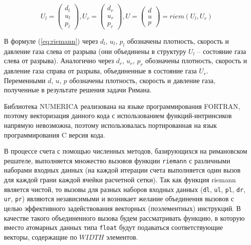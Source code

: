 \documentclass[
11pt,%
tightenlines,%
twoside,%
onecolumn,%
nofloats,%
nobibnotes,%
nofootinbib,%
superscriptaddress,%
noshowpacs,%
centertags]%
{revtex4}
\begin{document}
\begin{equation}\label{eq:riemann}
U_l = \left( \begin{array}{ccc} d_l \\ u_l \\ p_l \end{array} \right),
U_r = \left( \begin{array}{ccc} d_r \\ u_r \\ p_r \end{array} \right),
U = \left( \begin{array}{ccc} d \\ u \\ p \end{array} \right) = riem(U_l, U_r)
\end{equation}

В формуле (\ref{eq:riemann}) через $d_l$, $u_l$, $p_l$ обозначены плотность, скорость и давление газа слева от разрыва (они объединены в структуру  $U_l$ -- состояние газа слева от разрыва).
Аналогично через $d_r$, $u_r$, $p_r$ обозначены плотность, скорость и давление газа справа от разрыва, объединенные в состояние газа $U_r$.
Переменными $d$, $u$, $p$ обозначены плотность, скорость и давление газа, полученные в результате решения задачи Римана.

Библиотека NUMERICA реализована на языке программирования FORTRAN, поэтому векторизация данного кода с использованием функций-интринсиков напрямую невозможна, поэтому использовалась портированная на язык программирования C версия кода.

В процессе счета с помощью численных методов, базирующихся на римановском решателе, выполняется множество вызовов функции \texttt{riemann} с различными наборами входных данных (на каждой итерации счета выполняется один вызов для каждой грани каждой ячейки расчетной сетки).
Так как функция riemann является чистой, то вызовы для разных наборов входных данных (\texttt{dl}, \texttt{ul}, \texttt{pl}, \texttt{dr}, \texttt{ur}, \texttt{pr}) являются независимыми и возникает желание объединения вызовов с целью эффективного задействования векторных (поэлементных) инструкций.
В качестве такого объединенного вызова будем рассматривать функцию, в которую вместо атомарных данных типа \texttt{float} будут подаваться соответствующие векторы, содержащие по $WIDTH$ элементов.
\end{document}
